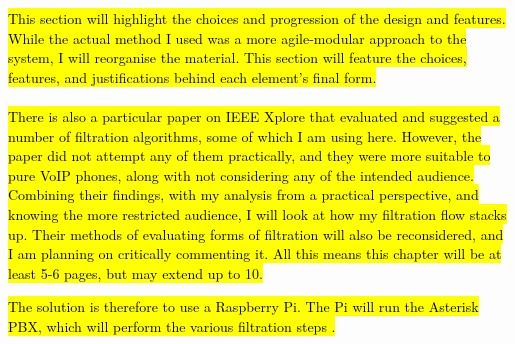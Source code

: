 \documentclass[main.tex]{subfiles}
\begin{document}
\hl{This section will highlight the choices and progression of the design and features. While the actual method I used was a more agile-modular approach to the system, I will reorganise the material. This section will feature the choices, features, and justifications behind each element's final form.}
\\\\
\hl{There is also a particular paper on IEEE Xplore that evaluated and suggested a number of filtration algorithms, some of which I am using here. However, the paper did not attempt any of them practically, and they were more suitable to pure VoIP phones, along with not considering any of the intended audience. Combining their findings, with my analysis from a practical perspective, and knowing the more restricted audience, I will look at how my filtration flow stacks up. Their methods of evaluating forms of filtration will also be reconsidered, and I am planning on critically commenting it. All this means this chapter will be at least 5-6 pages, but may extend up to 10.}


\hl{The solution is therefore to use a Raspberry Pi. The Pi will run the Asterisk PBX, which will perform the various filtration steps {\cite{raspbx}}.}
\end{document}

